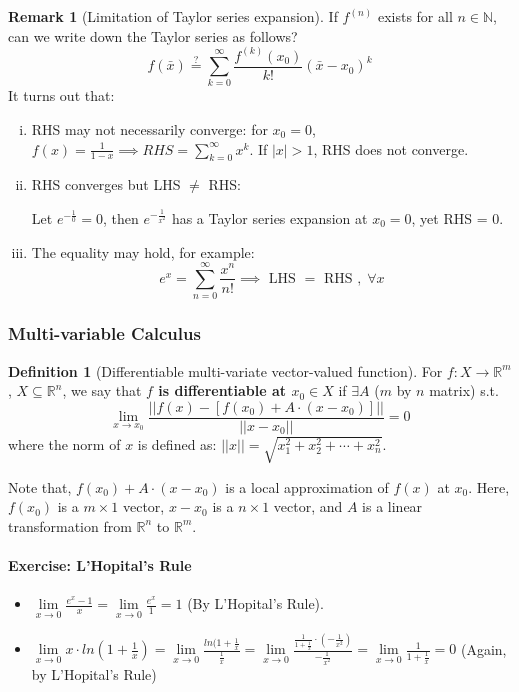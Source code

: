 \documentclass[12pt]{article}
\newcommand{\N}{{\mathbb N}}
\newcommand{\R}{{\mathbb R}}
\theoremstyle{definition}
\newtheorem{definition}[theorem]{Definition}
\newtheorem{remark}[theorem]{Remark}
\theoremstyle{plain}
\begin{document}
\setcounter{theorem}{3}

\begin{remark}
    [Limitation of Taylor series expansion]
    If $f^{(n)}$ exists for all $n \in \N$, can we write down the Taylor series 
    as follows?
    \[
        f(\bar x) \stackrel{?}{=} \sum_{k=0}^\infty \frac{f^{(k)}(x_0)}{k!} (\bar x - x_0)^k
    \]
    It turns out that: 
    \begin{enumerate}[(i)]
        \item RHS may not necessarily converge: for $x_0 = 0$, $f(x) =  
            \frac{1}{1-x} \implies RHS = \sum_{k=0}^\infty x^k$. If $|x| > 1$, 
            RHS does not converge.
        \item RHS converges but LHS $\not=$ RHS:

            Let $e^{-\frac{1}{0}} = 0$, then $e^{-\frac{1}{x^2}}$ has a Taylor 
            series expansion at $x_0 = 0$, yet RHS = 0.
        \item The equality may hold, for example: 
            \[
                e^x = \sum_{n=0}^\infty \frac{x^n}{n!} \implies \text{ LHS } = 
                \text{ RHS }, \; \forall x 
            \]
    \end{enumerate}
\end{remark}

\subsubsection{Multi-variable Calculus}
\begin{definition}
    [Differentiable multi-variate vector-valued function]
    \label{sec:multi_variable_matrix_A_as_gradient}
    For $f: X\to \R^m$, $X \subseteq \R^n$, we say that \textbf{$f$ is 
    differentiable at $x_0 \in X$} if $\exists A$ ($m$ by $n$ matrix) s.t. 
    \[
        \lim_{x \to x_0} 
        \frac{||f(x) - [f(x_0) + A \cdot (x - x_0)]||}
        {||x - 
        x_0||} = 0
    \]
    where the norm of $x$ is defined as: $||x|| = \sqrt{x_1^2 + x_2^2 + \cdots + 
    x_n^2}$.
\end{definition}
Note that, $f(x_0) + A \cdot (x - x_0)$ is a local approximation of $f(x)$ at 
$x_0$. Here, $f(x_0)$ is a $m \times 1$ vector, $x - x_0$ is a $n\times 1$ 
vector, and $A$ is a linear transformation from $\R^n$ to $\R^m$.

\paragraph{Exercise: L'Hopital's Rule}
\begin{itemize}
    \item $\underset{x \to 0} \lim  \frac{e^x- 1}{x} = \underset{x \to 0} 
        \lim \frac{e^x}{1} = 1$ (By L'Hopital's Rule).
    \item $\underset{x \to 0} \lim x \cdot ln ( 1 + \frac{1}{x}) = 
        \underset{x \to 0}\lim \frac{ln(1 + \frac{1}{x}}{\frac{1}{x}} = 
            \underset{x \to 0} \lim \frac{\frac{1}{1+\frac{1}{x}} \cdot \left( 
            -\frac{1}{x^2} \right)}{-\frac{1}{x^2}} = \underset{x \to 0}\lim 
            \frac{1}{1 + \frac{1}{x}} = 0$ (Again, by L'Hopital's Rule)
\end{itemize}
\end{document}
